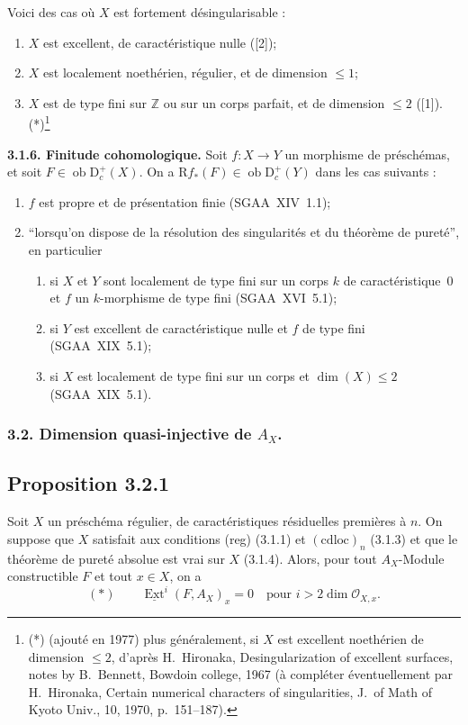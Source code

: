 \documentclass[11pt]{article}
\providecommand{\cO}{\mathcal{O}}
\DeclareMathOperator{\Ext}{Ext}
\newcommand{\R}{\mathrm{R}}
\newcommand{\D}{\mathrm{D}}
\newcommand{\Z}{\mathbb{Z}}
\newcommand{\ob}{\operatorname{ob}}
\providecommand{\ob}{\operatorname{ob}}
\begin{document}
Voici des cas où $X$ est fortement désingularisable :
\begin{enumerate}
\item[a)] $X$ est excellent, de caractéristique nulle ([2]);
\item[b)] $X$ est localement noethérien, régulier, et de dimension $\leqslant 1$;
\item[c)] $X$ est de type fini sur $\Z$ ou sur un corps parfait, et de dimension $\leqslant 2$ ([1]).(*)\footnote{(*) (ajouté en 1977) plus généralement, si $X$ est excellent noethérien de dimension $\leqslant 2$, d'après H.~Hironaka, Desingularization of excellent surfaces, notes by B.~Bennett, Bowdoin college, 1967 (à compléter éventuellement par H.~Hironaka, Certain numerical characters of singularities, J.~of Math of Kyoto Univ., 10, 1970, p.~151--187).}
\end{enumerate}

\textbf{3.1.6. Finitude cohomologique.} Soit $f : X \to Y$ un morphisme de préschémas, et soit $F \in \ob \D_c^{+}(X)$. On a $\R f_{*}(F) \in \ob \D_c^{+}(Y)$ dans les cas suivants :
\begin{enumerate}
\item[a)] $f$ est propre et de présentation finie (SGAA~XIV~1.1);
\item[b)] ``lorsqu'on dispose de la résolution des singularités et du théorème de pureté'', en particulier
\begin{enumerate}
\item[(i)] si $X$ et $Y$ sont localement de type fini sur un corps $k$ de caractéristique~0 et $f$ un $k$-morphisme de type fini (SGAA~XVI~5.1);
\item[(ii)] si $Y$ est excellent de caractéristique nulle et $f$ de type fini (SGAA~XIX~5.1);
\item[(iii)] si $X$ est localement de type fini sur un corps et $\dim(X) \leqslant 2$ (SGAA~XIX~5.1).
\end{enumerate}
\end{enumerate}

\subsubsection{3.2. Dimension quasi-injective de $A_X$.}

\subsection*{Proposition 3.2.1}
Soit $X$ un préschéma régulier, de caractéristiques résiduelles premières à $n$. On suppose que $X$ satisfait aux conditions (reg) (3.1.1) et $(\mathrm{cdloc})_n$ (3.1.3) et que le théorème de pureté absolue est vrai sur $X$ (3.1.4). Alors, pour tout $A_X$-Module constructible $F$ et tout $x \in X$, on a
\[
(*) \qquad \underline{\Ext}^i(F, A_X)_x = 0 \quad \text{pour } i > 2\dim \cO_{X,x}.
\]
\end{document}
